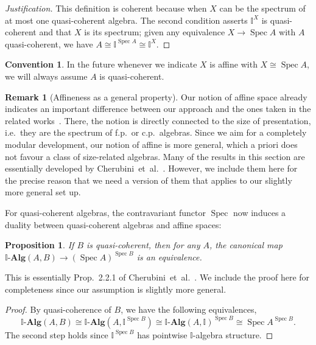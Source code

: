 \documentclass[12pt]{amsart}
\newtheorem{proposition}[theorem]{Proposition}
\theoremstyle{definition}
\newtheorem{convention}[theorem]{Convention}
\newtheorem{remark}[theorem]{Remark}
\newcommand{\mb}[1]{\mathbf{#1}}
\newcommand{\mbb}[1]{\mathbb{#1}}
\newcommand{\I}{\mbb I}
\newcommand{\alg}{\text{-}\mb{Alg}}
\newcommand{\spec}{\operatorname{Spec}}
\begin{document}
\begin{proof}[Justification]
  This definition is coherent because when $X$ can be the spectrum of at most one quasi-coherent algebra. The second condition asserts $\I^X$ is quasi-coherent and that $X$ is its spectrum; given any equivalence $X\to \spec{A}$ with $A$ quasi-coherent, we have
  $
    A\cong \I^{\spec{A}} \cong \I^X
  $.
\end{proof}

\begin{convention}
  In the future whenever we indicate $X$ is affine with $X \cong \spec A$, we will always assume $A$ is quasi-coherent.
\end{convention}

\begin{remark}[Affineness as a general property]
  Our notion of affine space already indicates an important difference between our approach and the ones taken in the related works~\cite{Cherubini_Coquand_Hutzler_2024,cherubini2024foundation}. There, the notion is directly connected to the size of presentation, i.e.\ they are the spectrum of f.p.\ or c.p.\ algebras. Since we aim for a completely modular development, our notion of affine is more general, which a priori does not favour a class of size-related algebras. Many of the results in this section are essentially developed by Cherubini~et~al.~\cite{Cherubini_Coquand_Hutzler_2024}. However, we include them here for the precise reason that we need a version of them that applies to our slightly more general set up.
\end{remark}

For quasi-coherent algebras, the contravariant functor $\spec$ now induces a duality between quasi-coherent algebras and affine spaces:

\begin{proposition}\label{prop:duality}
  If $B$ is quasi-coherent, then for any $A$, the canonical map $\I\alg(A,B)\to (\spec A)^{\spec B}$ is an equivalence.
\end{proposition}
This is essentially Prop.~2.2.1 of Cherubini~et~al.~\cite{Cherubini_Coquand_Hutzler_2024}. We include the proof here for completeness since our assumption is slightly more general.
\begin{proof}
 By quasi-coherence of $B$, we have the following equivalences,
  \[ \I\alg(A,B) \cong \I\alg(A,\I^{\spec B}) \cong \I\alg(A,\I)^{\spec B} \cong \spec A^{\spec B}. \]
  The second step holds since $\I^{\spec B}$ has pointwise $\I$-algebra structure.
\end{proof}
\end{document}
